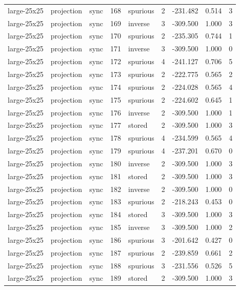\begin{tabular}{lllrlrrrr}
large-25x25 & projection & sync & 168 & spurious & 2 & -231.482 & 0.514 & 3 \\
large-25x25 & projection & sync & 169 & inverse & 3 & -309.500 & 1.000 & 3 \\
large-25x25 & projection & sync & 170 & spurious & 2 & -235.305 & 0.744 & 1 \\
large-25x25 & projection & sync & 171 & inverse & 3 & -309.500 & 1.000 & 0 \\
large-25x25 & projection & sync & 172 & spurious & 4 & -241.127 & 0.706 & 5 \\
large-25x25 & projection & sync & 173 & spurious & 2 & -222.775 & 0.565 & 2 \\
large-25x25 & projection & sync & 174 & spurious & 2 & -224.028 & 0.565 & 4 \\
large-25x25 & projection & sync & 175 & spurious & 2 & -224.602 & 0.645 & 1 \\
large-25x25 & projection & sync & 176 & inverse & 2 & -309.500 & 1.000 & 1 \\
large-25x25 & projection & sync & 177 & stored & 2 & -309.500 & 1.000 & 3 \\
large-25x25 & projection & sync & 178 & spurious & 4 & -234.599 & 0.565 & 4 \\
large-25x25 & projection & sync & 179 & spurious & 4 & -237.201 & 0.670 & 0 \\
large-25x25 & projection & sync & 180 & inverse & 2 & -309.500 & 1.000 & 3 \\
large-25x25 & projection & sync & 181 & stored & 2 & -309.500 & 1.000 & 3 \\
large-25x25 & projection & sync & 182 & inverse & 2 & -309.500 & 1.000 & 0 \\
large-25x25 & projection & sync & 183 & spurious & 2 & -218.243 & 0.453 & 0 \\
large-25x25 & projection & sync & 184 & stored & 3 & -309.500 & 1.000 & 3 \\
large-25x25 & projection & sync & 185 & inverse & 3 & -309.500 & 1.000 & 2 \\
large-25x25 & projection & sync & 186 & spurious & 3 & -201.642 & 0.427 & 0 \\
large-25x25 & projection & sync & 187 & spurious & 2 & -239.859 & 0.661 & 2 \\
large-25x25 & projection & sync & 188 & spurious & 3 & -231.556 & 0.526 & 5 \\
large-25x25 & projection & sync & 189 & stored & 2 & -309.500 & 1.000 & 3 \\

\end{tabular}
